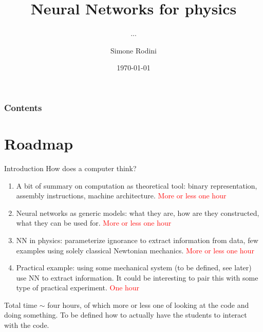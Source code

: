 \documentclass[10pt]{beamer}
\title{Neural Networks for physics}
\subtitle{...}
\author[S. Rodini]{Simone Rodini}
\date[\today]{\today}
\newcommand{\green}[1]{\textcolor{myGreen}{#1}}
\newcommand{\red}[1]{\textcolor{red}{#1}}
\renewcommand{\[}{\begin{equation}}
\renewcommand{\]}{\end{equation}}
\begin{document}
\frame{\titlepage}
\begin{frame}
\frametitle{Contents}
\tableofcontents
\end{frame}
\section{Roadmap}
\begin{frame}{Introduction}
How does a computer think? 
\begin{enumerate}
    \item A bit of summary on computation as theoretical tool: binary representation, assembly instructions, machine architecture. \red{More or less one hour}
    \item Neural networks as generic models: what they are, how are they constructed, what they can be used for. \red{More or less one hour}
    \item NN in physics: parameterize ignorance to extract information from data, few examples using solely classical Newtonian mechanics. \red{More or less one hour}
    \item Practical example: using some mechanical system (to be defined, see later) use NN to extract information. It could be interesting to pair this with some type of practical experiment. \red{One hour}
\end{enumerate}
\green{Total time $\sim$ four hours, of which more or less one of looking at the code and doing something. To be defined how to actually have the students to interact with the code.}
\end{frame}




\end{document}
